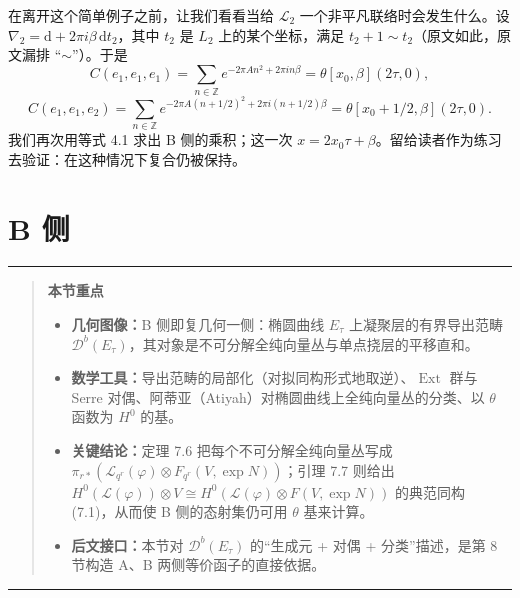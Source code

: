 \documentclass[11pt,a4paper]{article}
\theoremstyle{plain}
\theoremstyle{definition}
\newenvironment{keytakeaways}[1][本节重点]{%
  \par\addvspace{9pt}%
  \noindent\rule{\linewidth}{0.7pt}\par\nobreak
  \begin{quote}\noindent\textbf{#1}\par\small
}{%
  \end{quote}%
  \noindent\rule{\linewidth}{0.7pt}\par\addvspace{7pt}%
}
\begin{document}

在离开这个简单例子之前，让我们看看当给 $\mathcal{L}_2$ 一个非平凡联络时会发生什么。设 $\nabla_2=\mathrm{d}+2\pi i\beta\,\mathrm{d}t_2$，其中 $t_2$ 是 $L_2$ 上的某个坐标，满足 $t_2+1\sim t_2$（原文如此，原文漏排 “$\sim$”）。于是
\[
  C(e_1,e_1,e_1)=\sum_{n\in\mathbb{Z}}e^{-2\pi An^2+2\pi in\beta}=\theta[x_0,\beta](2\tau,0),
\]
\[
  C(e_1,e_1,e_2)=\sum_{n\in\mathbb{Z}}e^{-2\pi A(n+1/2)^2+2\pi i(n+1/2)\beta}
  =\theta[x_0+1/2,\beta](2\tau,0).
\]
我们再次用等式 4.1 求出 B 侧的乘积；这一次 $x=2x_0\tau+\beta$。留给读者作为练习去验证：在这种情况下复合仍被保持。

\section{B 侧}

\begin{keytakeaways}
\begin{itemize}[leftmargin=1.6em,itemsep=1pt,topsep=2pt]
  \item \textbf{几何图像：}B 侧即复几何一侧：椭圆曲线 $E_\tau$ 上凝聚层的有界导出范畴 $\mathcal{D}^b(E_\tau)$，其对象是不可分解全纯向量丛与单点挠层的平移直和。
  \item \textbf{数学工具：}导出范畴的局部化（对拟同构形式地取逆）、$\operatorname{Ext}$ 群与 Serre 对偶、阿蒂亚（Atiyah）对椭圆曲线上全纯向量丛的分类、以 $\theta$ 函数为 $H^0$ 的基。
  \item \textbf{关键结论：}定理 7.6 把每个不可分解全纯向量丛写成 $\pi_{r*}(\mathcal{L}_{q^r}(\varphi)\otimes F_{q^r}(V,\exp N))$；引理 7.7 则给出 $H^0(\mathcal{L}(\varphi))\otimes V\cong H^0(\mathcal{L}(\varphi)\otimes F(V,\exp N))$ 的典范同构 (7.1)，从而使 B 侧的态射集仍可用 $\theta$ 基来计算。
  \item \textbf{后文接口：}本节对 $\mathcal{D}^b(E_\tau)$ 的“生成元 + 对偶 + 分类”描述，是第 8 节构造 A、B 两侧等价函子的直接依据。
\end{itemize}
\end{keytakeaways}
\end{document}
